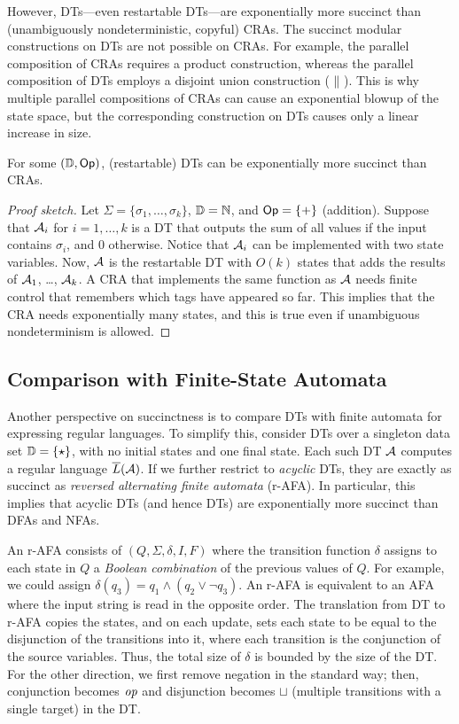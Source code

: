 However, DTs---even restartable DTs---are exponentially more succinct than (unambiguously nondeterministic, copyful) CRAs.
The succinct modular constructions on DTs are not possible on CRAs. For example, the parallel composition of CRAs requires a product construction, whereas the parallel composition of DTs employs a disjoint union construction ($\; \| \;$). This is why multiple parallel compositions of CRAs can cause an exponential blowup of the state space, but the corresponding construction on DTs causes only a linear increase in size.

\begin{theorem}
For some $(\mathbb{D}, \textsf{Op})$, (restartable) DTs can be exponentially more succinct than CRAs.
\end{theorem}
\begin{proof}[Proof sketch]
Let $\Sigma = \{\sigma_1, \ldots, \sigma_k\}$, $\mathbb{D} = \mathbb{N}$, and $\textsf{Op} = \{+\}$ (addition). Suppose that $\mathcal{A}_i$ for $i=1,\ldots,k$ is a DT that outputs the sum of all values if the input contains $\sigma_i$, and $0$ otherwise. Notice that $\mathcal{A}_i$ can be implemented with two state variables. Now, $\mathcal{A}$ is the restartable DT with $O(k)$ states that adds the results of $\mathcal{A}_1$, \ldots, $\mathcal{A}_k$. A CRA that implements the same function as $\mathcal{A}$ needs finite control that remembers which tags have appeared so far. This implies that the CRA needs exponentially many states, and this is true even if unambiguous nondeterminism is allowed.
\end{proof}

\subsection{Comparison with Finite-State Automata}
\label{dt:subsec:dts-and-fsa}

Another perspective on succinctness is to compare DTs with finite automata for expressing regular languages.
To simplify this, consider DTs over a singleton data set $\mathbb{D} = \{\star\}$, with no initial states and one final state. Each such DT $\mathcal{A}$ computes a regular language $\overline{L}(\mathcal{A})$.
If we further restrict to \emph{acyclic} DTs, they are exactly as succinct as \emph{reversed alternating finite automata} (r-AFA). In particular, this implies that acyclic DTs (and hence DTs) are exponentially more succinct than  DFAs and NFAs.

An r-AFA \cite{chandra1981alternation,salomaa2000efficient} consists of $(Q, \Sigma, \delta, I, F)$ where the transition function $\delta$ assigns to each state in $Q$ a \emph{Boolean combination} of the previous values of $Q$. For example, we could assign $\delta(q_3) = q_1 \land (q_2 \lor \lnot q_3)$. An r-AFA is equivalent to an AFA where the input string is read in the opposite order.
The translation from DT to r-AFA copies the states, and on each update, sets each state to be equal to the disjunction of the transitions into it, where each transition is the conjunction of the source variables. Thus, the total size of $\delta$ is bounded by the size of the DT.
For the other direction, we first remove negation in the standard way; then, conjunction becomes $\mathit{op}$ and disjunction becomes $\sqcup$ (multiple transitions with a single target) in the DT.

